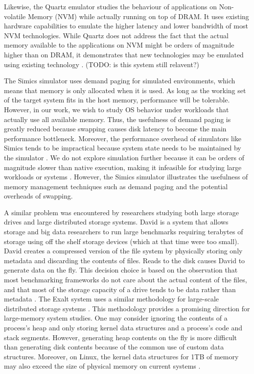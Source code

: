 \documentclass[twocolumn,11pt]{article}
\begin{document}
Likewise, the Quartz emulator studies the behaviour of applications on
Non-volatile Memory (NVM) while actually running on top of DRAM. It uses
existing hardware capabilities to emulate the higher latency and lower bandwidth
of most NVM technologies. While Quartz does not address the fact that the actual
memory available to the applications on NVM might be orders of magnitude higher
than on DRAM, it demonstrates that new technologies may be emulated using
existing technology \cite{quartz}. (TODO: is this system still relavent?)

The Simics simulator uses demand paging for simulated environments, which means
that memory is only allocated when it is used. As long as the working set of
the target system fits in the host memory, performance will be tolerable.
However, in our work, we wish to study OS behavior under workloads that
actually use all available memory. Thus, the usefulness of demand paging is
greatly reduced because swapping causes disk latency to become the main
performance bottleneck. Moreover, the performance overhead of simulators like
Simics tends to be impractical because system state needs to be maintained by
the simulator \cite{simics}. We do not explore simulation further because it
can be orders of magnitude slower than native execution, making it infeasible
for studying large workloads or systems \cite{2kmachine}. However, the Simics
simulator illustrates the usefulness of memory management techniques such as
demand paging and the potential overheads of swapping.

A similar problem was encountered by researchers studying both large storage
drives and large distributed storage systems. David is a system that allows
storage and big data researchers to run large benchmarks requiring terabytes of
storage using off the shelf storage devices (which at that time were too small).
David creates a compressed version of the file system by physically storing only
metadata and discarding the contents of files. Reads to the disk causes David to
generate data on the fly. This decision choice is based on the observation that
most benchmarking frameworks do not care about the actual content of the files,
and that most of the storage capacity of a drive tends to be data rather than
metadata \cite{david}. The Exalt system uses a similar methodology for
large-scale distributed storage systems \cite{exalt}. This methodology provides
a promising direction for large-memory system studies. One may consider ignoring
the contents of a process’s heap and only storing kernel data structures and a
process’s code and stack segments. However, generating heap contents on the fly
is more difficult than generating disk contents because of the common use of
custom data structures. Moreover, on Linux, the kernel data structures for 1TB
of memory may also exceed the size of physical memory on current systems
\cite{simics}.
\end{document}

